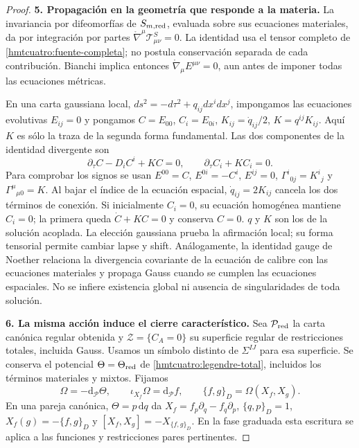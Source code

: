 \begin{proof}
\par\medskip\noindent\textbf{5. Propagación en la geometría que responde a la materia.}\quad
La invariancia por difeomorfías de \(S_{m,\rm red}\), evaluada sobre
sus ecuaciones materiales, da por integración por partes
\(\mathring\nabla^\mu\mathcal T^S_{\mu\nu}=0\). La identidad usa el
tensor completo de \eqref{hmtcuatro:fuente-completa}; no postula
conservación separada de cada contribución.
Bianchi implica entonces
\(\mathring\nabla_\mu E^{\mu\nu}=0\), aun antes de imponer
todas las ecuaciones métricas.

En una carta gaussiana local,
\(ds^2=-d\tau^2+q_{ij}dx^idx^j\), impongamos las ecuaciones
evolutivas \(E_{ij}=0\) y pongamos
\(C=E_{00}\), \(C_i=E_{0i}\),
\(K_{ij}=\dot q_{ij}/2\), \(K=q^{ij}K_{ij}\).
Aquí \(K\) es sólo la traza de la segunda forma fundamental.
Las dos componentes de la identidad divergente son
\begin{equation}
 \partial_\tau C-D_iC^i+KC=0,\qquad
 \partial_\tau C_i+KC_i=0.
 \label{hmtcuatro:propagacion}
\end{equation}
Para comprobar los signos se usan
\(E^{00}=C\), \(E^{0i}=-C^i\), \(E^{ij}=0\),
\(\Gamma^i{}_{0j}=K^i{}_j\) y
\(\Gamma^\mu{}_{\mu0}=K\). Al bajar el índice de la ecuación
espacial, \(\dot q_{ij}=2K_{ij}\) cancela los dos términos de conexión.
Si inicialmente \(C_i=0\), su ecuación homogénea mantiene \(C_i=0\);
la primera queda \(\dot C+KC=0\) y conserva \(C=0\).
\(q\) y \(K\) son los de la solución acoplada. La elección gaussiana
prueba la afirmación local; su forma tensorial permite cambiar lapse
y shift. Análogamente, la identidad gauge de Noether relaciona la
divergencia covariante de la ecuación de calibre con las ecuaciones
materiales y propaga Gauss cuando se cumplen las ecuaciones espaciales.
No se infiere existencia global ni ausencia de singularidades de
toda solución.

\par\medskip\noindent\textbf{6. La misma acción induce el cierre característico.}\quad
Sea \(\mathcal P_{\rm red}\) la carta canónica regular obtenida y
\(\mathcal Z=\{C_A=0\}\) su superficie regular de restricciones
totales, incluida Gauss. Usamos un símbolo distinto de \(\Sigma^{IJ}\)
para esa superficie. Se conserva el potencial \(\Theta=\Theta_{\rm red}\)
de \eqref{hmtcuatro:legendre-total}, incluidos los términos materiales
y mixtos. Fijamos
\begin{equation}
 \Omega=-\mathrm d_{\mathcal P}\Theta,\qquad
 \iota_{X_f}\Omega=\mathrm d_{\mathcal P}f,\qquad
 \{f,g\}_D=\Omega(X_f,X_g).
 \label{hmtcuatro:convenciones-simpecticas}
\end{equation}
En una pareja canónica, \(\Theta=p\,\mathrm dq\) da
\(X_f=f_p\partial_q-f_q\partial_p\), \(\{q,p\}_D=1\),
\(X_f(g)=-\{f,g\}_D\) y
\([X_f,X_g]=-X_{\{f,g\}_D}\). En la fase graduada esta escritura
se aplica a las funciones y restricciones pares pertinentes.


\end{proof}
